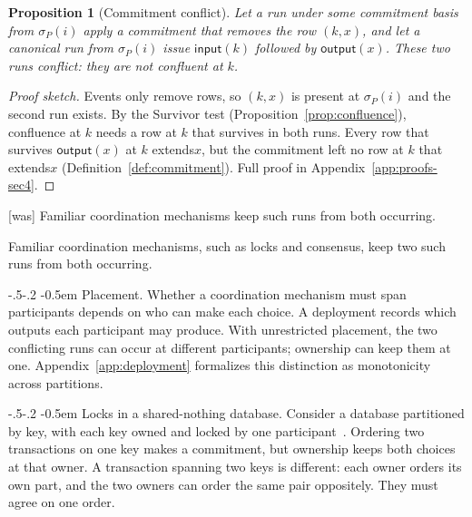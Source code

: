 \documentclass[sigconf]{cidr-2027}
\makeatletter
\newtheorem{proposition}{Proposition}
\theoremstyle{remark}
\renewcommand\paragraph{\@startsection{paragraph}{4}{\z@}%
  {-.5\baselineskip \@plus -2\p@ \@minus -.2\p@}%
  {-0.5em}%
  {\normalfont\bfseries}}
\newcommand{\commitment}{commitment\xspace}
\newcommand{\outrel}{extends\xspace}          %
\makeatother
\begin{document}
\begin{proposition}[Commitment conflict]
\label{prop:commitment-conflict}
Let a run under some \commitment basis from $\sigma_P(i)$ apply a \commitment
that removes the row $(k,x)$, and let a canonical run from $\sigma_P(i)$ issue
$\mathsf{input}(k)$ followed by $\mathsf{output}(x)$.  These two runs
\emph{conflict}: they are not confluent at $k$.
\end{proposition}

\begin{proof}[Proof sketch]
Events only remove rows, so $(k,x)$ is present at $\sigma_P(i)$ and the
second run exists.  By the Survivor test (Proposition~\ref{prop:confluence}),
confluence at $k$ needs a row at $k$ that survives in both runs.  Every row
that survives $\mathsf{output}(x)$ at $k$ \outrel $x$, but the \commitment left
no row at $k$ that \outrel $x$ (Definition~\ref{def:commitment}).  Full proof
in Appendix~\ref{app:proofs-sec4}.
\end{proof}



{\footnotesize\color{black!50}\noindent\textsf{[was]} Familiar coordination mechanisms keep such runs from both occurring.\par}

\color{blue!70!black}Familiar coordination mechanisms, such as locks and consensus, keep two such
runs from both occurring.\color{black}

\paragraph{Placement.}
Whether a coordination mechanism must span participants depends on who can make
each choice.  A deployment records which outputs each participant may produce.
With unrestricted placement, the two conflicting runs can occur at different
participants; ownership can keep them at one.  Appendix~\ref{app:deployment}
formalizes this distinction as monotonicity across partitions.

\paragraph{Locks in a shared-nothing database.}
Consider a database partitioned by key, with each key owned and locked by one
participant~\cite{stonebraker1986sharednothing}.  Ordering two transactions on
one key makes a \commitment, but ownership keeps both choices at that owner.  A
transaction spanning two keys is different: each owner orders its own part, and
the two owners can order the same pair oppositely.  They must agree on one
order.
\end{document}
